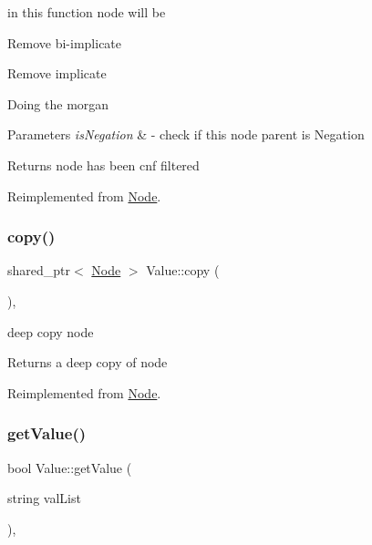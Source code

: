 in this function node will be 


\begin{DoxyItemize}
\item Remove bi-\/implicate
\item Remove implicate
\item Doing the morgan 
\begin{DoxyParams}{Parameters}
{\em is\+Negation} & -\/ check if this node parent is Negation \\
\hline
\end{DoxyParams}
\begin{DoxyReturn}{Returns}
node has been cnf filtered 
\end{DoxyReturn}

\end{DoxyItemize}

Reimplemented from \hyperlink{class_node_ab5b01fd3c4efe0f2eaf7fc41653359b7}{Node}.

\mbox{\label{class_value_a45518c11045a76300ad02cc93a0150c9}} 
\subsubsection{\texorpdfstring{copy()}{copy()}}
{\footnotesize\ttfamily shared\+\_\+ptr$<$ \hyperlink{class_node}{Node} $>$ Value\+::copy (\begin{DoxyParamCaption}{ }\end{DoxyParamCaption})\hspace{0.3cm}{\ttfamily [override]}, {\ttfamily [virtual]}}



deep copy node 

\begin{DoxyReturn}{Returns}
a deep copy of node 
\end{DoxyReturn}


Reimplemented from \hyperlink{class_node_a0d22a418a622a24852610fd51910c5eb}{Node}.

\mbox{\label{class_value_ac956d02a49c773f5249cc31fb4293337}} 
\subsubsection{\texorpdfstring{get\+Value()}{getValue()}}
{\footnotesize\ttfamily bool Value\+::get\+Value (\begin{DoxyParamCaption}\item[{string}]{val\+List }\end{DoxyParamCaption})\hspace{0.3cm}{\ttfamily [override]}, {\ttfamily [virtual]}}



